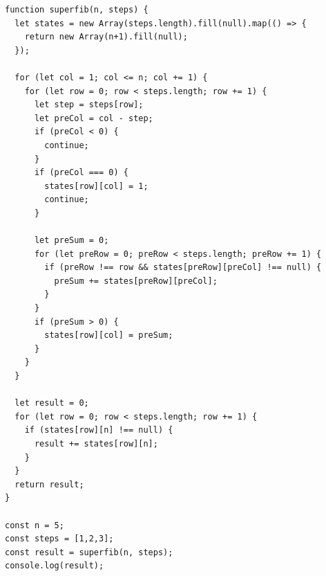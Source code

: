 \begin{verbatim}
function superfib(n, steps) {
  let states = new Array(steps.length).fill(null).map(() => {
    return new Array(n+1).fill(null);
  });

  for (let col = 1; col <= n; col += 1) {
    for (let row = 0; row < steps.length; row += 1) {
      let step = steps[row];
      let preCol = col - step;
      if (preCol < 0) {
        continue;
      }
      if (preCol === 0) {
        states[row][col] = 1;
        continue;
      }

      let preSum = 0;
      for (let preRow = 0; preRow < steps.length; preRow += 1) {
        if (preRow !== row && states[preRow][preCol] !== null) {
          preSum += states[preRow][preCol];
        }
      }
      if (preSum > 0) {
        states[row][col] = preSum;
      }
    }
  }

  let result = 0;
  for (let row = 0; row < steps.length; row += 1) {
    if (states[row][n] !== null) {
      result += states[row][n];
    }
  }
  return result;
}

const n = 5;
const steps = [1,2,3];
const result = superfib(n, steps);
console.log(result);
\end{verbatim}
